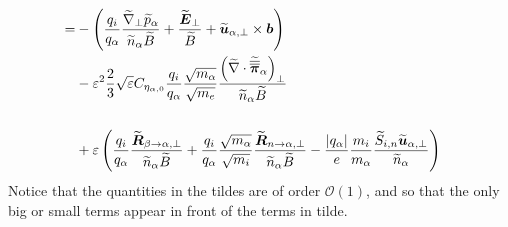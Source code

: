 \begin{align*}
 \\
 =&
 - \left( \frac{q_i}{q_\alpha} \frac{ \widetilde{ \nabla}_\perp \widetilde{ p}_\alpha }{\widetilde{ n}_\alpha \widetilde{ B}} + \frac{\widetilde{ \boldsymbol{E}}_\perp}{\widetilde{ B}} + \widetilde{ \boldsymbol{u}}_{\alpha,\perp}\times\boldsymbol{b} \right)
 \\&
 - \varepsilon^2 \frac{2}{3}\sqrt{\varepsilon} C_{\eta_{\alpha,0}} \frac{q_i}{q_\alpha} \frac{\sqrt{m_\alpha}}{\sqrt{m_e}} \frac{ \left(\widetilde{ \nabla}\cdot\widetilde{ \boldsymbol{\overline{\overline{\pi}}}}_\alpha\right)_\perp }{\widetilde{ n}_\alpha \widetilde{ B}}
 \\&
 \\&
 + \varepsilon
 \left(
  \frac{q_i}{q_\alpha} \frac{\widetilde{ \boldsymbol{R}}_{\beta \to \alpha,\perp} }{\widetilde{ n}_\alpha \widetilde{ B}}
 + \frac{q_i}{q_\alpha} \frac{\sqrt{m_\alpha}}{\sqrt{m_i}}  \frac{\widetilde{ \boldsymbol{R}}_{n \to \alpha,\perp} }{\widetilde{ n}_\alpha  \widetilde{ B}}
 - \frac{|q_\alpha|}{e} \frac{m_i}{m_\alpha} \frac{ \widetilde{ S}_{i,n}\widetilde{ \boldsymbol{u}}_{\alpha,\perp} }{\widetilde{ n}_\alpha}
 \right)
\end{align*}
%
Notice that the quantities in the tildes are of order $\mathcal{O}(1)$, and so that the only big or small terms appear in front of the terms in tilde.

